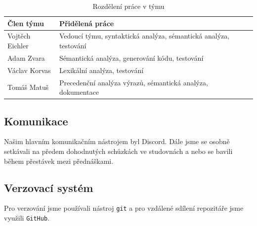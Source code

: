 \documentclass[11pt]{article}
\begin{document}
\begin{table}[H]
    \centering
    \begin{tabular}{|l|l|}
        \hline
        \textbf{Člen týmu} & \textbf{Přidělená práce} \\\hline
        Vojtěch Eichler & Vedoucí týmu, syntaktická analýza, sémantická analýza, testování \\
        Adam Zvara & Sémantická analýza, generování kódu, testování \\
        Václav Korvas & Lexikální analýza, testování \\
        Tomáš Matuš & Precedenční analýza výrazů, sémantická analýza, dokumentace \\\hline
    \end{tabular}
    \label{tabulka_rozdeleni_prace}
    \caption{Rozdělení práce v týmu}
\end{table}

\subsection{Komunikace}
Našim hlavním komunikačním nástrojem byl Discord.
Dále jsme se osobně setkávali na předem dohodnutých schůzkách ve studovnách a nebo se bavili během přestávek mezi přednáškami.

\subsection{Verzovací systém}
Pro verzování jsme používali nástroj \texttt{git} a pro vzdálené sdílení repozitáře jsme využili \texttt{GitHub}.
\end{document}
